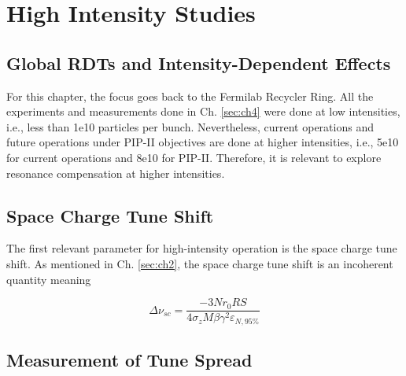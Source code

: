 \chapter{High Intensity Studies}
\label{sec:ch6}

\section{Global RDTs and Intensity-Dependent Effects}

For this chapter, the focus goes back to the Fermilab Recycler Ring. All the experiments and measurements done in Ch. \ref{sec:ch4} were done at low intensities, i.e., less than 1e10 particles per bunch. Nevertheless, current operations and future operations under PIP-II objectives are done at higher intensities, i.e., 5e10 for current operations and 8e10 for PIP-II. Therefore, it is relevant to explore resonance compensation at higher intensities. 

\section{Space Charge Tune Shift}

The first relevant parameter for high-intensity operation is the space charge tune shift. As mentioned in Ch. \ref{sec:ch2}, the space charge tune shift is an incoherent quantity meaning  

\begin{equation}
    \Delta \nu_{sc}=\frac{-3 N r_0 R S}{4 \sigma_z M \beta \gamma ^2 \varepsilon_{N,95\%}}    
\end{equation}

\section{Measurement of Tune Spread}


